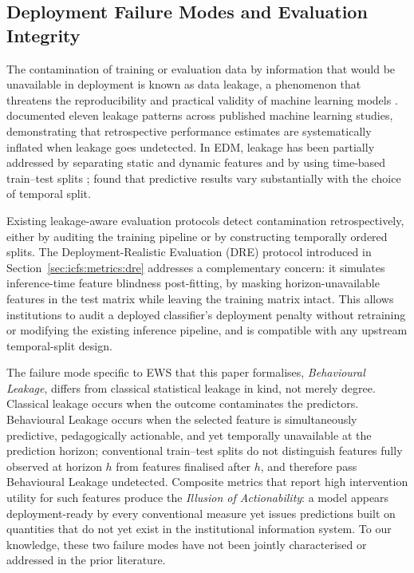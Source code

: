 \documentclass[a4paper,fleqn]{cas-sc}
\begin{document}
\subsection{Deployment Failure Modes and Evaluation Integrity}
\label{sec:related_work:leakage}
 
The contamination of training or evaluation data by information that would be unavailable in deployment is known as data leakage, a phenomenon that threatens the reproducibility and practical validity of machine learning models \citep{kaufman2012,kapoor2023,apicella2025}. \citet{kapoor2023} documented eleven leakage patterns across published machine learning studies, demonstrating that retrospective performance estimates are systematically inflated when leakage goes undetected.
In EDM, leakage has been partially addressed by separating static and dynamic features \citep{hlosta2017} and by using time-based train--test splits \citep{chen2020}; \citet{gardner2018, glandorf2024} found that predictive results vary substantially with the choice of temporal split.
 
Existing leakage-aware evaluation protocols detect contamination retrospectively, either by auditing the training pipeline or by
constructing temporally ordered splits. The Deployment-Realistic Evaluation (DRE) protocol introduced in Section~\ref{sec:icfs:metrics:dre} addresses a complementary concern: it simulates inference-time feature blindness post-fitting, by masking horizon-unavailable features in the test matrix while leaving
the training matrix intact. This allows institutions to audit a deployed classifier's deployment penalty without retraining or modifying the existing inference pipeline, and is compatible with any upstream temporal-split design.
 
The failure mode specific to EWS that this paper formalises, \emph{Behavioural Leakage}, differs from classical statistical leakage \citep{kaufman2012,kapoor2023} in kind, not merely degree. Classical leakage occurs when the outcome contaminates the predictors. Behavioural Leakage occurs when the selected feature is simultaneously
predictive, pedagogically actionable, and yet temporally unavailable at the prediction horizon; conventional train--test splits do not distinguish features fully observed at horizon $h$ from features finalised after $h$, and therefore pass Behavioural Leakage undetected. Composite metrics that report high intervention utility for such features produce the \emph{Illusion of Actionability}: a model appears deployment-ready by every conventional measure yet issues predictions built on quantities that do not yet exist in the institutional information system. To our knowledge, these two failure modes have not been jointly characterised or addressed in the prior literature.
 
\end{document}
